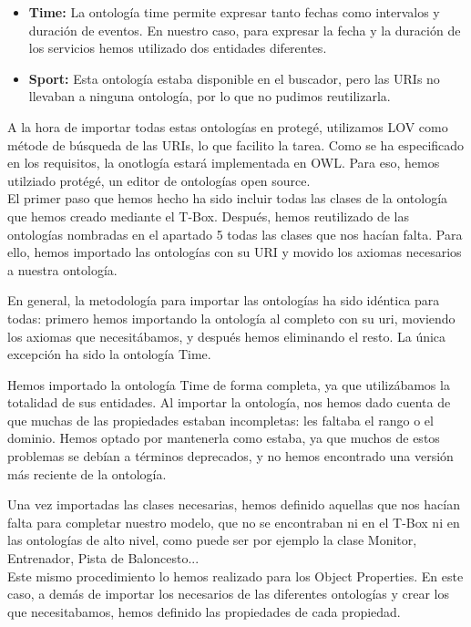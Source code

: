 \documentclass[a4paper,12pt]{article}
\begin{document}
	\begin{itemize}
		\item \textbf{Time:} La ontología time permite expresar tanto fechas como intervalos y duración de eventos. En nuestro caso, para expresar la fecha y la duración de los servicios hemos utilizado dos entidades diferentes.
		\item \textbf{Sport:} Esta ontología estaba disponible en el buscador, pero las URIs no llevaban a ninguna ontología, por lo que no pudimos reutilizarla. 
	\end{itemize}
	A la hora de importar todas estas ontologías en protegé, utilizamos LOV como métode de búsqueda de las URIs, lo que facilito la tarea. 
	Como se ha especificado en los requisitos, la onotlogía estará implementada en OWL. Para eso, hemos utilziado protégé, un editor de ontologías open source. \\
	
	El primer paso que hemos hecho ha sido incluir todas las clases de la ontología que hemos creado mediante el T-Box. Después, hemos reutilizado de las ontologías nombradas en el apartado 5 todas las clases que nos hacían falta. Para ello, hemos importado las ontologías con su URI y movido los axiomas necesarios a nuestra ontología.
	
	En general, la metodología para importar las ontologías ha sido idéntica para todas: primero hemos importando la ontología al completo con su uri, moviendo los axiomas que necesitábamos, y después hemos eliminando el resto. La única excepción ha sido la ontología Time. 
	
	Hemos importado la ontología Time de forma completa, ya que utilizábamos la totalidad de sus entidades. Al importar la ontología, nos hemos dado cuenta de que muchas de las propiedades estaban incompletas: les faltaba el rango o el dominio. Hemos optado por mantenerla como estaba, ya que muchos de estos problemas se debían a términos deprecados, y no hemos encontrado una versión más reciente de la ontología.
	
	Una vez importadas las clases necesarias, hemos definido aquellas que nos hacían falta para completar nuestro modelo, que no se encontraban ni en el T-Box ni en las ontologías de alto nivel, como puede ser por ejemplo la clase Monitor, Entrenador, Pista de Baloncesto... \\
		
	Este mismo procedimiento lo hemos realizado para los Object Properties. En este caso, a demás de importar los necesarios de las diferentes ontologías y crear los que necesitabamos, hemos definido las propiedades de cada propiedad. \\
		
\end{document}
